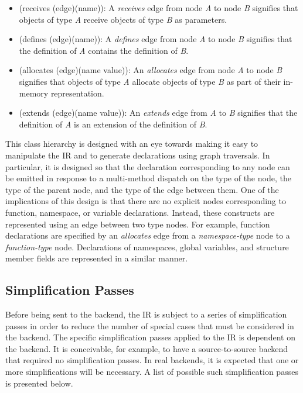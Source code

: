 \documentclass[12pt]{article}
\begin{document}
\begin{itemize}
\item (receives (edge)(name)): A \emph{receives} edge from node \emph{A} to node \emph{B} signifies that objects of type \emph{A} receive objects of type \emph{B} as parameters.
\item (defines (edge)(name)): A \emph{defines} edge from node \emph{A} to node \emph{B} signifies that the definition of \emph{A} contains the definition of \emph{B}.
\item (allocates (edge)(name value)): An \emph{allocates} edge from node \emph{A} to node \emph{B} signifies that objects of type \emph{A} allocate objects of type \emph{B} as part of their in-memory representation. 
\item (extends (edge)(name value)): An \emph{extends} edge from \emph{A} to \emph{B} signifies that the definition of \emph{A} is an extension of the definition of \emph{B}. 
\end{itemize}

This class hierarchy is designed with an eye towards making it easy to manipulate the IR and to generate declarations using graph traversals. In particular, it is designed so that the declaration corresponding to any node can be emitted in response to a multi-method dispatch on the type of the node, the type of the parent node, and the type of the edge between them. One of the implications of this design is that there are no explicit nodes corresponding to function, namespace, or variable declarations. Instead, these constructs are represented using an edge between two type nodes. For example, function declarations are specified by an \emph{allocates} edge from a \emph{namespace-type} node to a \emph{function-type} node. Declarations of namespaces, global variables, and structure member fields are represented in a similar manner. 

\subsection{Simplification Passes}
Before being sent to the backend, the IR is subject to a series of simplification passes in order to reduce the number of special cases that must be considered in the backend. The specific simplification passes applied to the IR is dependent on the backend. It is conceivable, for example, to have a source-to-source backend that required no simplification passes. In real backends, it is expected that one or more simplifications will be necessary. A list of possible such simplification passes is presented below.
\end{document}
